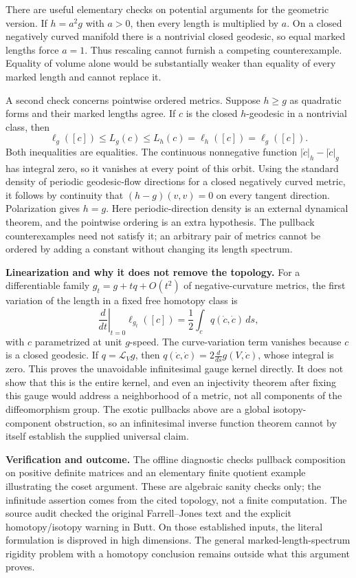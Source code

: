 \documentclass[11pt]{article}
\begin{document}
There are useful elementary checks on potential arguments for the geometric
version.  If $h=a^2g$ with $a>0$, then every length is multiplied by $a$.  On a
closed negatively curved manifold there is a nontrivial closed geodesic, so
equal marked lengths force $a=1$.  Thus rescaling cannot furnish a competing
counterexample.  Equality of volume alone would be substantially weaker than
equality of every marked length and cannot replace it.

A second check concerns pointwise ordered metrics.  Suppose $h\geq g$ as
quadratic forms and their marked lengths agree.  If $c$ is the closed
$h$-geodesic in a nontrivial class, then
\[
 \ell_g([c])\leq L_g(c)\leq L_h(c)=\ell_h([c])=\ell_g([c]).
\]
Both inequalities are equalities.  The continuous nonnegative function
$|\dot c|_h-|\dot c|_g$ has integral zero, so it vanishes at every point of
this orbit.  Using the standard density of periodic geodesic-flow directions
for a closed negatively curved metric, it follows by continuity that
$(h-g)(v,v)=0$ on every tangent direction.  Polarization gives $h=g$.
Here periodic-direction density is an external dynamical theorem, and the
pointwise ordering is an extra hypothesis.  The pullback counterexamples need
not satisfy it; an arbitrary pair of metrics cannot be ordered by adding a
constant without changing its length spectrum.

\textbf{Linearization and why it does not remove the topology.}
For a differentiable family $g_t=g+tq+O(t^2)$ of negative-curvature metrics,
the first variation of the length in a fixed free homotopy class is
\[
 \left.\frac{d}{dt}\right|_{t=0}\ell_{g_t}([c])
 =\frac12\int_c q(\dot c,\dot c)\,ds,
\]
with $c$ parametrized at unit $g$-speed.  The curve-variation term vanishes
because $c$ is a closed geodesic.  If $q=\mathcal L_Vg$, then
$q(\dot c,\dot c)=2\frac{d}{ds}g(V,\dot c)$, whose integral is zero.
This proves the unavoidable infinitesimal gauge kernel directly.
It does not show that this is the entire kernel, and even an injectivity
theorem after fixing this gauge would address a neighborhood of a metric,
not all components of the diffeomorphism group.  The exotic pullbacks above
are a global isotopy-component obstruction, so an infinitesimal inverse
function theorem cannot by itself establish the supplied universal claim.

\textbf{Verification and outcome.}
The offline diagnostic checks pullback composition on positive definite
matrices and an elementary finite quotient example illustrating the coset
argument.  These are algebraic sanity checks only; the infinitude assertion
comes from the cited topology, not a finite computation.  The source audit
checked the original Farrell--Jones text and the explicit homotopy/isotopy
warning in Butt.  On those established inputs, the literal formulation is
disproved in high dimensions.  The general marked-length-spectrum rigidity
problem with a homotopy conclusion remains outside what this argument proves.
\end{document}
